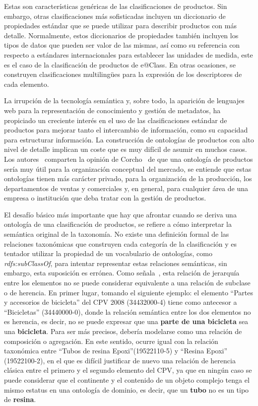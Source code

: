 Estas son características genéricas de las clasificaciones de productos. Sin
embargo, otras clasificaciones más sofisticadas incluyen un diccionario de propiedades
estándar que se puede utilizar para describir productos con más detalle.
Normalmente, estos diccionarios de propiedades también incluyen los tipos de
datos que pueden ser valor de las mismas, así como su referencia con respecto a estándares internacionales para establecer las unidades de medida, este es el caso
de la clasificación de productos de e@Class. En otras ocasiones, se construyen
clasificaciones multiling\"{u}es para la expresión de los descriptores de cada
elemento. 

La irrupción de la tecnología semántica y, sobre todo, la aparición de
lenguajes web para la representación de conocimiento y gestión de metadatos, ha
propiciado un creciente interés en el uso de las clasificaciones estándar de productos para mejorar tanto el
intercambio de información, como su capacidad para estructurar información. La construcción de ontologías de productos 
con alto nivel de detalle implican un coste que es muy difícil de asumir en muchos casos. 
Los autores~\cite{Yu:2009:CSI:1693684.1693743,FenselOmel2001,FenselDing2001} comparten la opinión de Corcho~\cite{CorchoECommerce} 
de que una ontología de productos sería muy útil para la organización conceptual del mercado, se entiende que estas ontologías tienen
más carácter privado, para la organización de la producción, los departamentos
de ventas y comerciales y, en general, para cualquier área de una empresa o
institución que deba tratar con la gestión de productos.

El desafío básico más importante que hay que afrontar cuando se deriva una
ontología de una clasificación de productos, se refiere a cómo interpretar la semántica original de la taxonomía.
No existe una definición formal de las relaciones taxonómicas que construyen
cada categoría de la clasificación y es tentador utilizar la propiedad de un
vocabulario de ontologías, como \textit{rdfs:subClassOf}, para intentar
representar estas relaciones semánticas, sin embargo, esta suposición es errónea. Como señala~\cite{HeppMethodology}, esta relación de jerarquía entre los elementos no se puede considerar
equivalente a una relación de subclase o de herencia. En primer
lugar, tomando el siguiente ejemplo: el elemento ``Partes y accesorios de
bicicleta'' del \gls{CPV} 2008 (34432000-4) tiene como antecesor a ``Bicicletas''
(34440000-0), donde la relación semántica entre los dos elementos no es
herencia, es decir, no se puede expresar que una \textbf{parte de una bicicleta}
sea una \textbf{bicicleta}. Para ser más precisos, debería modelarse como una relación de
composición o agregación. En este sentido, ocurre igual con la relación
taxonómica entre ``Tubos de resina Epoxi''(19522110-5) y ``Resina Epoxi''
(19522100-2), en el que es difícil justificar de nuevo una relación de herencia
clásica entre el primero y el segundo elemento del CPV, ya que en ningún caso
se puede considerar que el continente y el contenido de un objeto complejo tenga
el mismo estatus en una ontología de dominio, es decir, que un \textbf{tubo} no
es un tipo de \textbf{resina}.

